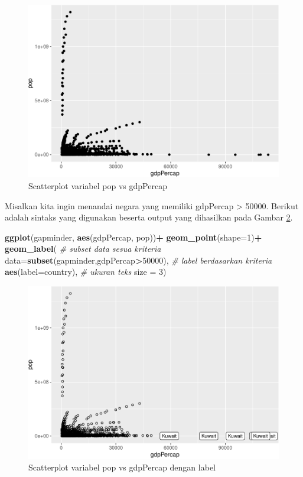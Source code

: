 \documentclass[]{book}
\newenvironment{Shaded}{\begin{snugshade}}{\end{snugshade}}
\newcommand{\KeywordTok}[1]{\textcolor[rgb]{0.13,0.29,0.53}{\textbf{#1}}}
\newcommand{\DataTypeTok}[1]{\textcolor[rgb]{0.13,0.29,0.53}{#1}}
\newcommand{\DecValTok}[1]{\textcolor[rgb]{0.00,0.00,0.81}{#1}}
\newcommand{\StringTok}[1]{\textcolor[rgb]{0.31,0.60,0.02}{#1}}
\newcommand{\CommentTok}[1]{\textcolor[rgb]{0.56,0.35,0.01}{\textit{#1}}}
\newcommand{\OperatorTok}[1]{\textcolor[rgb]{0.81,0.36,0.00}{\textbf{#1}}}
\newcommand{\NormalTok}[1]{#1}
\begin{document}
\begin{figure}

{\centering \includegraphics[width=0.7\linewidth]{EnvStat_files/figure-latex/gglabel-1} 

}

\caption{Scatterplot variabel pop vs gdpPercap}\label{fig:gglabel}
\end{figure}

Misalkan kita ingin menandai negara yang memiliki gdpPercap
\textgreater{} 50000. Berikut adalah sintaks yang digunakan beserta
output yang dihasilkan pada Gambar \ref{fig:gglabel2}.

\begin{Shaded}
\begin{Highlighting}[]
\KeywordTok{ggplot}\NormalTok{(gapminder, }\KeywordTok{aes}\NormalTok{(gdpPercap, pop))}\OperatorTok{+}
\StringTok{  }\KeywordTok{geom_point}\NormalTok{(}\DataTypeTok{shape=}\DecValTok{1}\NormalTok{)}\OperatorTok{+}
\StringTok{  }\KeywordTok{geom_label}\NormalTok{(}
    \CommentTok{# subset data sesua kriteria}
    \DataTypeTok{data=}\KeywordTok{subset}\NormalTok{(gapminder,gdpPercap}\OperatorTok{>}\DecValTok{50000}\NormalTok{),}
    \CommentTok{# label berdasarkan kriteria}
    \KeywordTok{aes}\NormalTok{(}\DataTypeTok{label=}\NormalTok{country),}
    \CommentTok{# ukuran teks}
    \DataTypeTok{size =} \DecValTok{3}\NormalTok{)}
\end{Highlighting}
\end{Shaded}

\begin{figure}

{\centering \includegraphics[width=0.7\linewidth]{EnvStat_files/figure-latex/gglabel2-1} 

}

\caption{Scatterplot variabel pop vs gdpPercap dengan label}\label{fig:gglabel2}
\end{figure}
\end{document}
